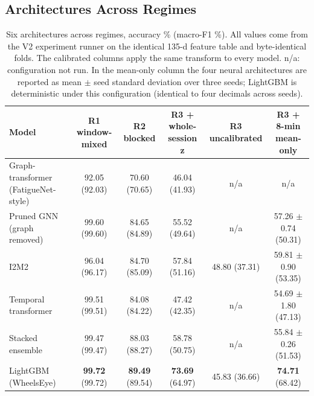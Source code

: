 \documentclass[journal]{IEEEtran}
\newcommand{\sysname}{WheelsEye}
\newcommand{\rone}{R1}
\newcommand{\rtwo}{R2}
\newcommand{\rthree}{R3}
\begin{document}
\subsection{Architectures Across Regimes}
\label{sec:archs}
\begin{table}[!t]
\caption{Six architectures across regimes, accuracy \% (macro-F1 \%). All
values come from the V2 experiment runner on the identical 135-d feature table
and byte-identical folds. The calibrated columns apply the same transform to
every model. n/a: configuration not run. In the mean-only column the four neural architectures are reported as mean $\pm$ seed standard deviation over three seeds; LightGBM is deterministic under this configuration (identical to four decimals across seeds).}
\label{tab:archs}
\centering\footnotesize
\begin{tabular}{@{}lccccc@{}}
\toprule
Model & \rone{} window-mixed & \rtwo{} blocked & \rthree{} + whole-session z & \rthree{} uncalibrated & \rthree{} + 8-min mean-only \\
\midrule
Graph-transformer (FatigueNet-style)~\cite{zendehbad2025fatiguenet} & 92.05 (92.03) & 70.60 (70.65) & 46.04 (41.93) & n/a & n/a \\
Pruned GNN (graph removed)      & 99.60 (99.60) & 84.65 (84.89) & 55.52 (49.64) & n/a & 57.26 $\pm$ 0.74 (50.31) \\
I2M2~\cite{madaan2024i2m2}       & 96.04 (96.17) & 84.70 (85.09) & 57.84 (51.16) & 48.80 (37.31) & 59.81 $\pm$ 0.90 (53.35) \\
Temporal transformer            & 99.51 (99.51) & 84.08 (84.22) & 47.42 (42.35) & n/a & 54.69 $\pm$ 1.80 (47.13) \\
Stacked ensemble                & 99.47 (99.47) & 88.03 (88.27) & 58.78 (50.75) & n/a & 55.84 $\pm$ 0.26 (51.53) \\
LightGBM (\sysname)             & \textbf{99.72} (99.72) & \textbf{89.49} (89.54) & \textbf{73.69} (64.97) & 45.83 (36.66) & \textbf{74.71} (68.42) \\
\bottomrule
\end{tabular}
\end{table}
\end{document}

